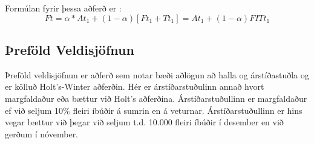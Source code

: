 Formúlan fyrir þessa aðferð er : $$Ft = \alpha * At_1 + (1-\alpha) [Ft_1 + Tt_1] =  At_1 + (1-\alpha) FITt_1$$


\subsection{Þreföld Veldisjöfnun}
Þreföld veldisjöfnun er aðferð sem notar bæði aðlögun að halla og árstíðastuðla og er kölluð Holt’s-Winter aðferðin. Hér er árstíðarstuðulinn annað hvort margfaldaður eða bættur við Holt’s aðferðina.
Árstíðarstuðullinn er margfaldaður ef við seljum 10\% fleiri íbúðir á sumrin en á veturnar. Árstíðarstuðullinn er hins vegar bættur við þegar við seljum t.d. 10.000 fleiri íbúðir í desember en við gerðum í nóvember.
 